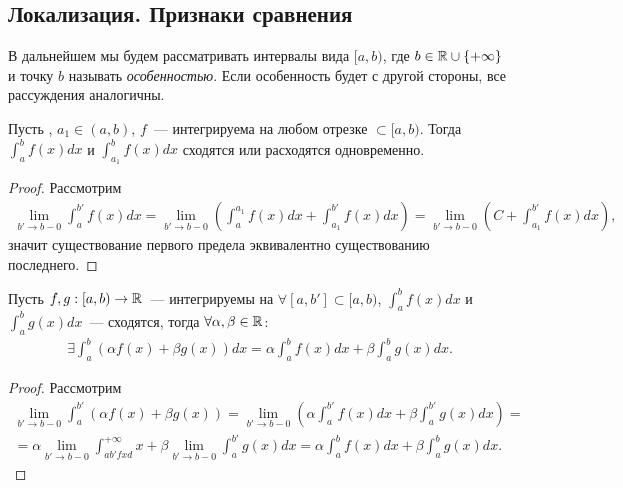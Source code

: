 \documentclass[../main.tex]{subfiles}
\begin{document}
    \subsection{Локализация. Признаки сравнения}

    \begin{note}
        В дальнейшем мы будем рассматривать интервалы вида $[a,b)$, где $b \in \mathbb{R} \cup \{ + \infty \} $ и точку $b$ называть \emph{особенностью}. Если особенность будет с другой стороны, все рассуждения аналогичны. 
    \end{note}

    
    \begin{proposition}
      Пусть \fabr, $a_1 \in (a, b)$, $f$~--- интегрируема на любом отрезке $\subset [a,b)$. Тогда $\int_{a}^{b} f(x) dx$ и $\int_{a_1}^{b} f(x) dx$ сходятся или расходятся одновременно.   
    \end{proposition}
    
    
    \begin{proof}
      Рассмотрим 
      \begin{gather} 
        \lim_{b' \to b-0} \int_{a}^{b'} f(x) dx = \lim _ {b' \to b - 0} \left(\int_{a}^{a_1 } f(x) dx + \int_{a_1 }^{b'} f(x) dx\right) = \lim_{b' \to b-0} \left( C +  \int_{a_1 }^{b'} f(x) dx\right),
      \end{gather}
      значит существование первого предела эквивалентно существованию последнего.
    \end{proof}
    
    
    \begin{proposition}
      Пусть $f, g: [a,b) \to \mathbb{R}$~--- интегрируемы на $\forall [a, b'] \subset [a,b)$, $\int_{a}^{b} f(x) dx$ и $\int_{a}^{b} g(x)dx$~---  сходятся, тогда $\forall \alpha, \beta \in \mathbb{R}$: 
      \begin{gather} 
        \exists \int_{a}^{b} (\alpha f(x) + \beta g(x) ) dx = \alpha \int_{a}^{b} f(x) dx + \beta \int_{a}^{b} g(x) dx .
      \end{gather} 
    \end{proposition}
    
    
    \begin{proof}
      Рассмотрим 
      \begin{gather} 
        \lim_{b' \to b-0} \int_{a}^{b'} \left(\alpha f(x)  + \beta g(x) \right) = \lim_{b' \to b-0} \left(\alpha \int_{a}^{b'} f(x) dx + \beta \int_{a}^{b'} g(x) dx \right) = \\ = \alpha \lim_{b' \to b-0} \int_{ab'fxd}^{+\infty} x + \beta \lim_{b' \to b-0} \int_{a}^{b'} g(x) dx = \alpha \int_{a}^{b} f(x) dx + \beta \int_{a}^{b} g(x) dx.
      \end{gather}
    \end{proof}
    
\end{document}
